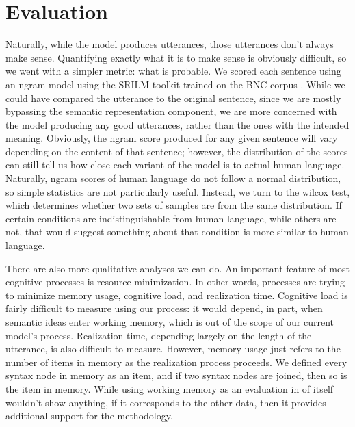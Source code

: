 \section{Evaluation}
Naturally, while the model produces utterances, those utterances don't always make sense. Quantifying exactly what it is to make sense is obviously difficult, so we went with a simpler metric: what is probable. We scored each sentence using an ngram model using the SRILM toolkit trained on the BNC corpus \citep{srilm}. While we could have compared the utterance to the original sentence, since we are mostly bypassing the semantic representation component, we are more concerned with the model producing any good utterances, rather than the ones with the intended meaning. Obviously, the ngram score produced for any given sentence will vary depending on the content of that sentence; however, the distribution of the scores can still tell us how close each variant of the model is to actual human language. Naturally, ngram scores of human language do not follow a normal distribution, so simple statistics are not particularly useful. Instead, we turn to the wilcox test, which determines whether two sets of samples are from the same distribution. If certain conditions are indistinguishable from human language, while others are not, that would suggest something about that condition is more similar to human language. 

There are also more qualitative analyses we can do. An important feature of most cognitive processes is resource minimization. In other words, processes are trying to minimize memory usage, cognitive load, and realization time. Cognitive load is fairly difficult to measure using our process: it would depend, in part, when semantic ideas enter working memory, which is out of the scope of our current model's process. Realization time, depending largely on the length of the utterance, is also difficult to measure. However, memory usage just refers to the number of items in memory as the realization process proceeds. We defined every syntax node in memory as an item, and if two syntax nodes are joined, then so is the item in memory. While using working memory as an evaluation in of itself wouldn't show anything, if it corresponds to the other data, then it provides additional support for the methodology.

